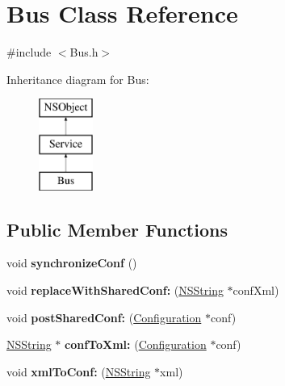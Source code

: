 \hypertarget{interface_bus}{
\section{\-Bus \-Class \-Reference}
\label{interface_bus}
}


{\ttfamily \#include $<$\-Bus.\-h$>$}

\-Inheritance diagram for \-Bus\-:\begin{figure}[H]
\begin{center}
\leavevmode
\includegraphics[height=3.000000cm]{interface_bus}
\end{center}
\end{figure}
\subsection*{\-Public \-Member \-Functions}
\begin{DoxyCompactItemize}
\item 
\hypertarget{interface_bus_a2d05e4d7022dfc1c451e91cf5a8853ed}{
void {\bfseries synchronize\-Conf} ()}
\label{interface_bus_a2d05e4d7022dfc1c451e91cf5a8853ed}

\item 
\hypertarget{interface_bus_a4e17c6b0a85578165ff2501fd0df8414}{
void {\bfseries replace\-With\-Shared\-Conf\-:} (\hyperlink{class_n_s_string}{\-N\-S\-String} $\ast$conf\-Xml)}
\label{interface_bus_a4e17c6b0a85578165ff2501fd0df8414}

\item 
\hypertarget{interface_bus_a01836e96c51b2e55e9a13b9be33f23a6}{
void {\bfseries post\-Shared\-Conf\-:} (\hyperlink{interface_configuration}{\-Configuration} $\ast$conf)}
\label{interface_bus_a01836e96c51b2e55e9a13b9be33f23a6}

\item 
\hypertarget{interface_bus_a81b470da7a3d41a40778e12d25368457}{
\hyperlink{class_n_s_string}{\-N\-S\-String} $\ast$ {\bfseries conf\-To\-Xml\-:} (\hyperlink{interface_configuration}{\-Configuration} $\ast$conf)}
\label{interface_bus_a81b470da7a3d41a40778e12d25368457}

\item 
\hypertarget{interface_bus_ae53fc8898a64e84bee2c1502633443e2}{
void {\bfseries xml\-To\-Conf\-:} (\hyperlink{class_n_s_string}{\-N\-S\-String} $\ast$xml)}
\label{interface_bus_ae53fc8898a64e84bee2c1502633443e2}

\end{DoxyCompactItemize}
